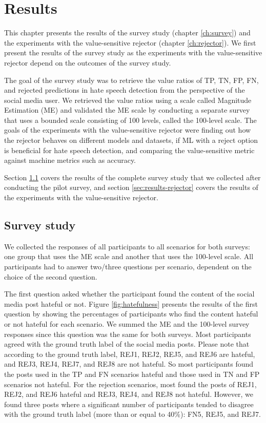 \chapter{Results}
This chapter presents the results of the survey study (chapter \ref{ch:survey}) and the experiments with the value-sensitive rejector (chapter \ref{ch:rejector}).
%
We first present the results of the survey study as the experiments with the value-sensitive rejector depend on the outcomes of the survey study.
%

%
The goal of the survey study was to retrieve the value ratios of TP, TN, FP, FN, and rejected predictions in hate speech detection from the perspective of the social media user.
%
We retrieved the value ratios using a scale called Magnitude Estimation (ME) and validated the ME scale by conducting a separate survey that uses a bounded scale consisting of 100 levels, called the 100-level scale.
%
The goals of the experiments with the value-sensitive rejector were finding out how the rejector behaves on different models and datasets, if ML with a reject option is beneficial for hate speech detection, and comparing the value-sensitive metric against machine metrics such as accuracy.
%

%
Section \ref{sec:results-survey-study} covers the results of the complete survey study that we collected after conducting the pilot survey, and section \ref{sec:results-rejector} covers the results of the experiments with the value-sensitive rejector.

\section{Survey study}
\label{sec:results-survey-study}
We collected the responses of all participants to all scenarios for both surveys: one group that uses the ME scale and another that uses the 100-level scale.
%
All participants had to answer two/three questions per scenario, dependent on the choice of the second question.
%

%
The first question asked whether the participant found the content of the social media post hateful or not.
%
Figure \ref{fig:hatefulness} presents the results of the first question by showing the percentages of participants who find the content hateful or not hateful for each scenario.
%
We summed the ME and the 100-level survey responses since this question was the same for both surveys.
%
Most participants agreed with the ground truth label of the social media posts.
%
Please note that according to the ground truth label, REJ1, REJ2, REJ5, and REJ6 are hateful, and REJ3, REJ4, REJ7, and REJ8 are not hateful.
%
So most participants found the posts used in the TP and FN scenarios hateful and those used in TN and FP scenarios not hateful.
%
For the rejection scenarios, most found the posts of REJ1, REJ2, and REJ6 hateful and REJ3, REJ4, and REJ8 not hateful.
%
However, we found three posts where a significant number of participants tended to disagree with the ground truth label (more than or equal to 40\%): FN5, REJ5, and REJ7.
%

